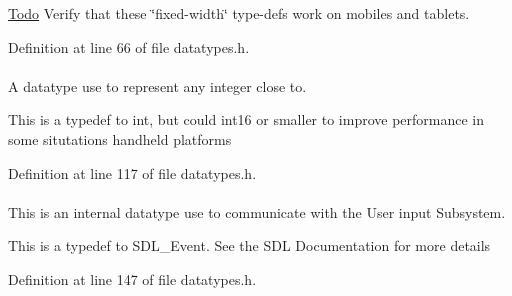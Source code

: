 \begin{Desc}
\item[\hyperlink{todo__todo000009}{Todo}]Verify that these \char`\"{}fixed-\/width\char`\"{} type-\/defs work on mobiles and tablets.\end{Desc}


Definition at line 66 of file datatypes.h.

\hypertarget{namespaceMezzanine_ac3576e52af3c62d13dde94829e0c5465}{
\paragraph[{Integer}]{}\hfill}
\label{namespaceMezzanine_ac3576e52af3c62d13dde94829e0c5465}


A datatype use to represent any integer close to. 

This is a typedef to int, but could int16 or smaller to improve performance in some situtations handheld platforms 

Definition at line 117 of file datatypes.h.

\hypertarget{namespaceMezzanine_ae8d4c0ab783af89a250b0225b75753e5}{
\paragraph[{RawEvent}]{}\hfill}
\label{namespaceMezzanine_ae8d4c0ab783af89a250b0225b75753e5}


This is an internal datatype use to communicate with the User input Subsystem. 

This is a typedef to SDL\_\-Event. See the SDL Documentation for more details 

Definition at line 147 of file datatypes.h.

\hypertarget{namespaceMezzanine_a726731b1a7df72bf3583e4a97282c6f6}{
\paragraph[{Real}]{}\hfill}
\label{namespaceMezzanine_a726731b1a7df72bf3583e4a97282c6f6}



